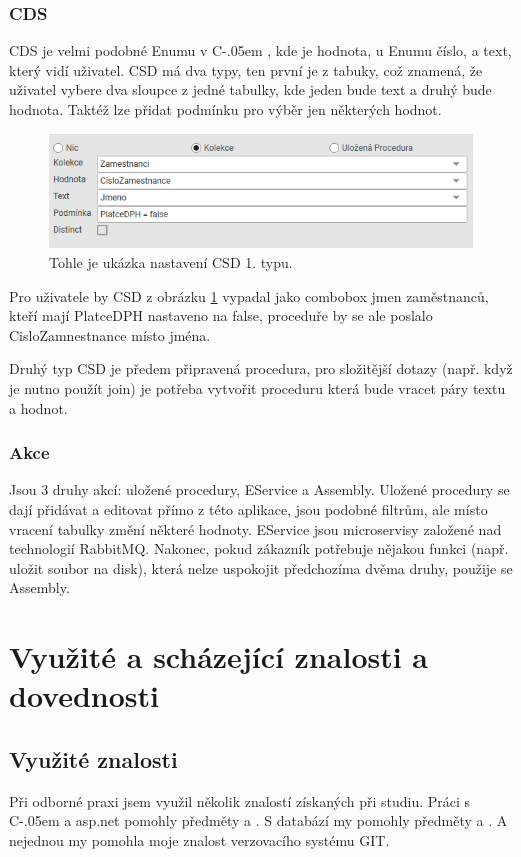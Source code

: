 \documentclass[czech,bachelor,dept460,male,csharp]{diploma}
\newcommand{\Csharp}{%
  {\settoheight{\dimen0}{C}C\kern-.05em \resizebox{!}{\dimen0}{\raisebox{\depth}{\#}}}}
\begin{document}
		\subsubsection{CDS}
			CDS je velmi podobné Enumu v \Csharp, kde je hodnota, u Enumu číslo, a text, který vidí uživatel. CSD má dva typy, ten první je z tabuky, což znamená, že uživatel vybere dva sloupce z jedné tabulky, kde jeden bude text a druhý bude hodnota. Taktéž lze přidat podmínku pro výběr jen některých hodnot.
			\begin{figure}[h]
				\includegraphics{Figures/cds.png}
				\caption{Tohle je ukázka nastavení CSD 1. typu.}
    			\label{fig:CSDimg}
			\end{figure}
			
			Pro uživatele by CSD z obrázku \ref{fig:CSDimg} vypadal jako combobox jmen zaměstnanců, kteří mají PlatceDPH nastaveno na false, proceduře by se ale poslalo CisloZamnestnance místo jména.
			
			Druhý typ CSD je předem připravená procedura, pro složitější dotazy (např. když je nutno použít join) je potřeba vytvořit proceduru která bude vracet páry textu a hodnot.
		\subsubsection{Akce}
			Jsou 3 druhy akcí: uložené procedury, EService a Assembly. Uložené procedury se dají přidávat a editovat přímo z této aplikace, jsou podobné filtrům, ale místo vracení tabulky změní některé hodnoty. EService jsou microservisy založené nad technologií RabbitMQ. Nakonec, pokud zákazník potřebuje nějakou funkci (např. uložit soubor na disk), která nelze uspokojit předchozíma dvěma druhy, použije se Assembly.
			
\section{Využité a scházející znalosti a dovednosti}
	\subsection{Využité znalosti}
		Při odborné praxi jsem využil několik znalostí získaných při studiu. Práci s {\Csharp} a asp.net pomohly předměty  a . S databází my pomohly předměty  a . A nejednou my pomohla moje znalost verzovacího systému GIT.
\end{document}
